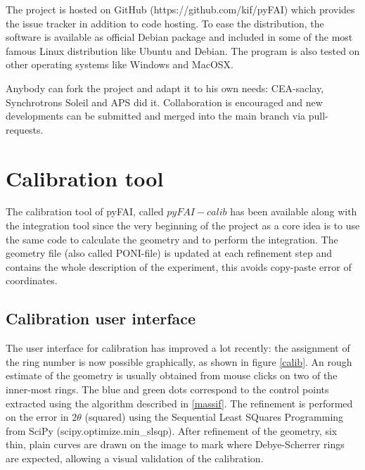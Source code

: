 \documentclass[preprint]{iucr}
\begin{document}
The project is hosted on GitHub (https://github.com/kif/pyFAI) which provides
the issue tracker in addition to code hosting.
To ease the distribution, the
software is available as official Debian package and included in some of the
most famous Linux distribution like Ubuntu and Debian.
The program is also tested on other operating systems like Windows and
MacOSX.

Anybody can fork the project and adapt it to his own needs: CEA-saclay,
Synchrotrons Soleil and APS did it. Collaboration is encouraged and 
new developments can be submitted and merged into the main branch
via pull-requests.

\section{Calibration tool}
\label{annex_calib}

The calibration tool of pyFAI, called $pyFAI-calib$ has been available along
with the integration tool since the very beginning of the project as a core idea
is to use the same code to calculate the geometry and to perform the integration.
The geometry file (also called PONI-file) is updated at each refinement step and
contains the whole description of the experiment, this avoids copy-paste 
error of coordinates.

\subsection{Calibration user interface}

The user interface for calibration has improved a lot recently: the assignment
of the ring number is now possible graphically, as shown in figure \ref{calib}.
An rough estimate of the geometry is usually obtained from mouse clicks on 
two of the inner-most rings. 
The blue and green dots correspond to the control points extracted using the
algorithm described in \ref{massif}.
The refinement is performed on the error in $2\theta$ (squared) using the 
Sequential Least SQuares Programming  from
SciPy (scipy.optimize.min_slsqp).
After refinement of the geometry, six thin, plain curves are drawn on the image
to mark where Debye-Scherrer rings are expected, allowing a visual validation of
the calibration. 
\end{document}

